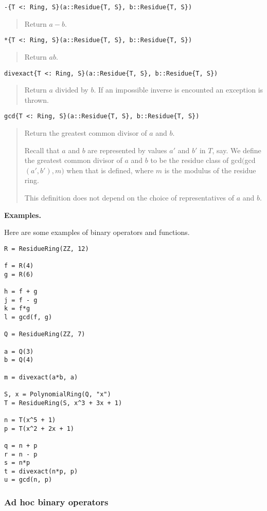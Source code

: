 \documentclass[a4paper,10pt]{article}
\newcommand{\desc}[1]{\vspace{-3mm}\begin{quote}#1\end{quote}}
\begin{document}
{{{\begin{lstlisting}
-{T <: Ring, S}(a::Residue{T, S}, b::Residue{T, S})
\end{lstlisting}

\desc{Return $a - b$.}

\begin{lstlisting}
*{T <: Ring, S}(a::Residue{T, S}, b::Residue{T, S})
\end{lstlisting}

\desc{Return $ab$.}

\begin{lstlisting}
divexact{T <: Ring, S}(a::Residue{T, S}, b::Residue{T, S})
\end{lstlisting}

\desc{Return $a$ divided by $b$. If an impossible inverse is encounted
an exception is thrown.}

\begin{lstlisting}
gcd{T <: Ring, S}(a::Residue{T, S}, b::Residue{T, S})
\end{lstlisting}

\desc{Return the greatest common divisor of $a$ and $b$. 

Recall that $a$ and $b$ are represented by values $a'$ and $b'$ in $T$, 
say. We define the greatest common divisor of $a$ and $b$ to be the 
residue class of gcd$($gcd$(a', b'), m)$ when that is defined, where 
$m$ is the modulus of the residue ring.

This definition does not depend on the choice of representatives of
$a$ and $b$.}

\textbf{Examples.}

Here are some examples of binary operators and functions.

\begin{lstlisting}
R = ResidueRing(ZZ, 12)

f = R(4)
g = R(6)

h = f + g
j = f - g
k = f*g
l = gcd(f, g)

Q = ResidueRing(ZZ, 7)

a = Q(3)
b = Q(4)

m = divexact(a*b, a)

S, x = PolynomialRing(Q, "x")
T = ResidueRing(S, x^3 + 3x + 1)

n = T(x^5 + 1)
p = T(x^2 + 2x + 1)

q = n + p
r = n - p
s = n*p
t = divexact(n*p, p)
u = gcd(n, p)
\end{lstlisting}

\subsubsection{Ad hoc binary operators}

}}}
\end{document}

